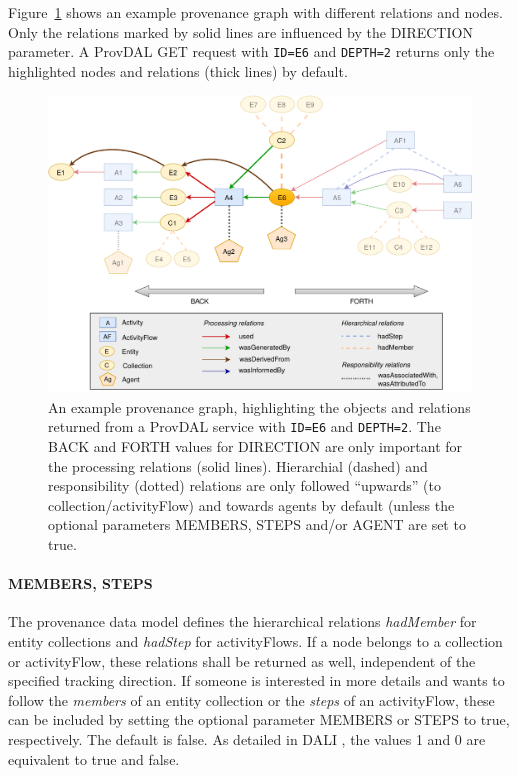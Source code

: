 Figure~\ref{fig:provenance-graph-example} shows an example provenance graph with different relations and nodes. Only the relations marked by solid lines are influenced by the DIRECTION parameter. A ProvDAL GET request with \texttt{ID=E6} and \texttt{DEPTH=2} returns only the highlighted nodes and relations (thick lines) by default.

\begin{figure}[h]
\centering
\includegraphics[width=1.0\textwidth]{provenance-graph-example-depth2.pdf}
\caption{An example provenance graph, highlighting the objects and relations returned from a ProvDAL service with \texttt{ID=E6} and \texttt{DEPTH=2}. The BACK and FORTH values for DIRECTION are only important for the processing relations (solid lines). Hierarchial (dashed) and responsibility (dotted) relations are only followed ``upwards'' (to collection/activityFlow) and towards agents by default (unless the optional parameters MEMBERS, STEPS and/or AGENT are set to true.}
\label{fig:provenance-graph-example}
\end{figure}




\paragraph{MEMBERS, STEPS}
The provenance data model defines the hierarchical relations \emph{hadMember} for entity collections and \emph{hadStep} for activityFlows. If a node belongs to a collection or activityFlow, these relations shall be returned as well, independent of the specified tracking direction.
If someone is interested in more details and wants to follow the \emph{members} of an entity collection or the \emph{steps} of an activityFlow, these can be included by setting the optional parameter MEMBERS or STEPS to true, respectively. The default is false. As detailed in DALI \citep{std:DALI}, the values 1 and 0 are equivalent to true and false.

